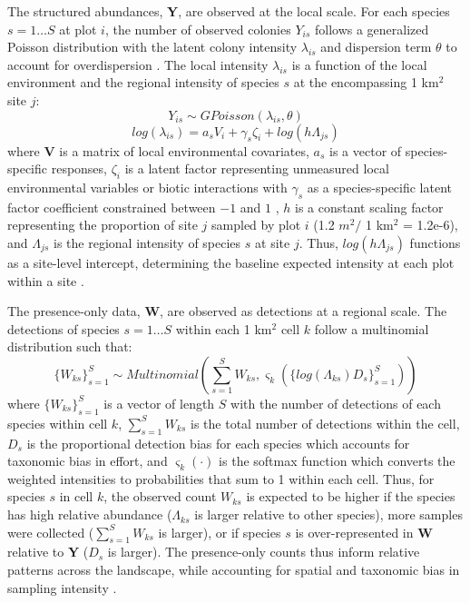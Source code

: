 \documentclass[preprint,final,times,12pt,3p]{elsarticle}
\begin{document}
The structured abundances, \textbf{Y}, are observed at the local scale. For each species $s=1 \dots S$  at plot $i$, the number of observed colonies $Y_{is}$ follows a generalized Poisson distribution with the latent colony intensity $\lambda_{is}$ and dispersion term $\theta$ to account for overdispersion \citep{Consul1992,Ntzoufras2005,Isaac2019,Miller2019}. The local intensity $\lambda_{is}$ is a function of the local environment and the regional intensity of species $s$ at the encompassing 1 km$^2$ site $j$:
    \begin{equation}
        Y_{is} \sim GPoisson(\lambda_{is}, \theta) 
        \label{eq:Y_GP}
    \end{equation}
    \begin{equation}
        log(\lambda_{is}) = a_s V_i + \gamma_s \zeta_i + log(h\Lambda_{js}) 
        \label{eq:lambda}
    \end{equation}
where \textbf{V} is a matrix of local environmental covariates, $a_s$ is a vector of species-specific responses, $\zeta_i$ is a latent factor representing unmeasured local environmental variables or biotic interactions with $\gamma_s$ as a species-specific latent factor coefficient constrained between $-1$ and $1$ \citep{Ovaskainen2016,Caradima2019,Tobler2019}, $h$ is a constant scaling factor representing the proportion of site $j$ sampled by plot $i$ (1.2 $m^2 /$ 1 km$^2$ = 1.2e-6), and $\Lambda_{js}$ is the regional intensity of species $s$ at site $j$. Thus, $log(h\Lambda_{js})$ functions as a site-level intercept, determining the baseline expected intensity at each plot within a site \citep{Yamaura2016,Miller2019}.

The presence-only data, \textbf{W}, are observed as detections at a regional scale. The detections of species $s=1 \dots S$ within each 1 km$^2$ cell $k$ follow a multinomial distribution such that:
    \begin{equation}
        \{W_{ks}\}_{s=1}^{S} \sim Multinomial(\sum_{s=1}^{S} W_{ks} , \varsigma_k(\{log(\Lambda_{ks})D_s\}_{s=1}^{S})) 
        \label{eq:W_Mn}
    \end{equation}
where $\{W_{ks}\}_{s=1}^{S}$ is a vector of length $S$ with the number of detections of each species within cell $k$, $\sum_{s=1}^{S} W_{ks}$ is the total number of detections within the cell, $D_s$ is the proportional detection bias for each species which accounts for taxonomic bias in effort, and $\varsigma_k(\cdot)$ is the softmax function which converts the weighted intensities to probabilities that sum to 1 within each cell. Thus, for species $s$ in cell $k$, the observed count $W_{ks}$ is expected to be higher if the species has high relative abundance ($\Lambda_{ks}$ is larger relative to other species), more samples were collected ($\sum_{s=1}^{S} W_{ks}$ is larger), or if species $s$ is over-represented in \textbf{W} relative to \textbf{Y} ($D_s$ is larger). The presence-only counts thus inform relative patterns across the landscape, while accounting for spatial and taxonomic bias in sampling intensity \citep{Isaac2014}.
\end{document}
